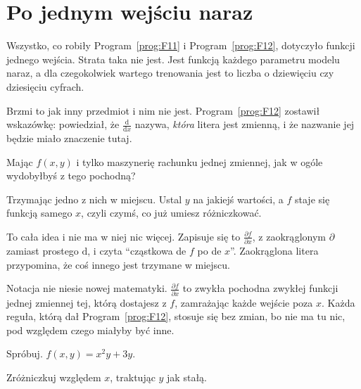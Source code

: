 \section{Po jednym wejściu naraz}
\label{sec:P15-partials}

\begin{fr}
Wszystko, co robiły Program~\ref{prog:F11} i Program~\ref{prog:F12}, dotyczyło
funkcji jednego wejścia. Strata taka nie jest. Jest funkcją każdego parametru
modelu naraz, a dla czegokolwiek wartego trenowania jest to liczba o dziewięciu
czy dziesięciu cyfrach.

Brzmi to jak inny przedmiot i nim nie jest. Program~\ref{prog:F12} zostawił
wskazówkę: powiedział, że $\frac{\mathrm{d}}{\mathrm{d}x}$ nazywa,
\emph{która} litera jest zmienną, i że nazwanie jej będzie miało znaczenie
tutaj.

Mając $f(x, y)$ i tylko maszynerię rachunku jednej zmiennej, jak w ogóle
wydobyłbyś z tego pochodną?
\dotline
\nextframe
\end{fr}

\begin{fr}
\begin{ansblock}
Trzymając jedno z nich w miejscu. Ustal $y$ na jakiejś wartości, a $f$ staje
się funkcją samego $x$, czyli czymś, co już umiesz różniczkować.
\end{ansblock}

To cała idea i nie ma w niej nic więcej. Zapisuje się to
$\frac{\partial f}{\partial x}$, z zaokrąglonym $\partial$ zamiast prostego
$\mathrm{d}$, i czyta \enquote{cząstkowa de $f$ po de $x$}. Zaokrąglona litera
przypomina, że coś innego jest trzymane w miejscu.

\begin{note}
Notacja nie niesie nowej matematyki. $\frac{\partial f}{\partial x}$ to zwykła
pochodna zwykłej funkcji jednej zmiennej \dash{} tej, którą dostajesz z $f$,
zamrażając każde wejście poza $x$. Każda reguła, którą dał
Program~\ref{prog:F12}, stosuje się bez zmian, bo nie ma tu nic, pod względem
czego miałyby być inne.
\end{note}

\end{fr}

\begin{fr}
Spróbuj. $f(x, y) = x^{2}y + 3y$.

Zróżniczkuj względem $x$, traktując $y$ jak stałą.
\dotline
\nextframe
\end{fr}

